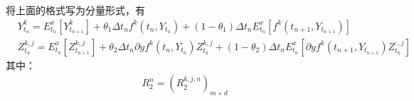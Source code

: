 			\par
			将上面的格式写为分量形式，有
				\begin{align*}
					&Y_{t_n}^k = E_{t_n}^x\left[Y_{t_{n + 1}}^k\right] + {\theta _1}\Delta {t_n}{f^k}\left(t_n,Y_{t_n}\right) + \left(1 - {\theta _1}\right)\Delta {t_n}E_{t_n}^x[f^k\left(t_{n + 1},Y_{t_{n + 1}}\right)]\\
					&Z_{t_n}^{k,j} = E_{t_n}^x\left[Z_{t_{n + 1}}^{k,j}\right] + {\theta _2}\Delta {t_n}\partial y{f^k}\left(t_n,Y_{t_n}\right)Z_{t_n}^{k,j} + \left(1 - {\theta _2} \right)\Delta {t_n}E_{t_n}^x\left[\partial yf^k\left(t_{n + 1},Y_{t_{n + 1}}\right)Z_{t_n}^{:,j} \right]
				\end{align*}
			其中：
			\begin{align*}
			R_2^n = \left(R_2^{k,j,n}\right)_{m \times d}
			\end{align*}
